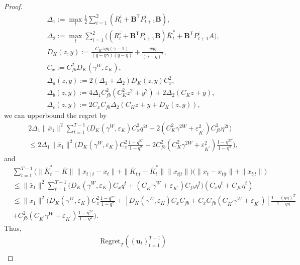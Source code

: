 \documentclass[letterpaper, 10 pt, conference]{ieeeconf}  %
\newcommand{\transpose}{\mathsf{T}}
\begin{document}
\begin{proof}
\begin{align*}
    &\Delta_{1} := \max_{t} \frac{1}{2}\sum_{i=1}^{2}(R_{t}^{i}+\mathbf{B}^{\transpose}P_{t+1}^{i}\mathbf{B}),\\
    &\Delta_{2} := \max_{t} \sum_{i=1}^{2}\bigg( (R_{t}^{i}+\mathbf{B}^{\transpose}P_{t+1}^{i}\mathbf{B})\bar{K}_{t}^{*}+\mathbf{B}^{\transpose}P_{t+1}^{i}A\bigg),\\
    &D_{K}(z,y) := \frac{C_{K}zq\eta(\gamma-1)}{(q-\eta\gamma)(q-\eta)} + \frac{yq\eta}{(q-\eta)^{2}},\\
    &C_{x} := C_{fb}^{2}D_{K}(\gamma^{W},\varepsilon_{K}),\\
    &\Delta_{a}(z,y) := 2(\Delta_{1}+\Delta_{2})D_{K}(z,y)C_{x}^{2},\\
    &\Delta_{b}(z,y) := 4\Delta_{1}C_{fb}^{2}(C_{K}^{2}z^{2}+y^{2})+2\Delta_{2}(C_{K}z+y),\\
    &\Delta_{c}(z,y) := 2C_{x}C_{fb}\Delta_{2}(C_{K}z+y+D_{K}(z,y)),
\end{align*}
we can upperbound the regret by
\begin{align*}
    &2\Delta_{1}\|\bar{x}_{1}\|^{2}\sum_{t=1}^{T-1}\bigg(D_{K}(\gamma^{W},\varepsilon_{K})C_{x}^{2}q^{2t} + 2(C_{K}^{2}\gamma^{2W}+\varepsilon_{K^{'}}^{2})C_{fb}^{2}\eta^{2t}\bigg) \\
    &\leq 2\Delta_{1}\|\bar{x}_{1}\|^{2}\bigg(D_{K}(\gamma^{W},\varepsilon_{K})C_{x}^{2}\frac{1-q^{2T}}{1-q^{2}} + 2C_{fb}^{2}(C_{K}^{2}\gamma^{2W}+\varepsilon_{K^{'}}^{2})\frac{1-\eta^{2T}}{1-\eta^{2}} \bigg),
\end{align*}
and
\begin{align*}
    &\sum_{t=1}^{T-1}\bigg( \|\bar{K}_{t}^{*}-\bar{K}\|\|x_{t\mid t}-x_{t}\|  + \|\bar{K}_{t|t}-\bar{K}_{t}^{*}\| \|x_{t|t}\|\bigg)\bigg(\|x_{t}-x_{t|t}\| + \|x_{t|t}\|\bigg)\\
    &\leq \|\bar{x}_{1}\|^{2}\sum_{t=1}^{T-1}\bigg(D_{K}(\gamma^{W},\varepsilon_{K})C_{x}q^{t}+(C_{K^{'}}\gamma^{W}+\varepsilon_{K^{'}})C_{fb}\eta^{t}\bigg)(C_{x}q^{t}+C_{fb}\eta^{t})\\
    &\leq \|\bar{x}_{1}\|^{2}\bigg(D_{K}(\gamma^{W},\varepsilon_{K})C_{x}^{2}\frac{1-q^{2T}}{1-q^{2}}+[D_{K}(\gamma^{W},\varepsilon_{K})C_{x}C_{fb}+C_{x}C_{fb}(C_{K^{'}}\gamma^{W}+\varepsilon_{K^{'}})]\frac{1-(q\eta)^{T}}{1-q\eta}\\
    &+ C_{fb}^{2}(C_{K^{'}}\gamma^{W}+\varepsilon_{K^{'}})\frac{1-\eta^{2T}}{1-\eta^{2}} \bigg).
\end{align*}
Thus,
\begin{align*}
    &\text{Regret}_{T}((\mathbf{u}_{t})_{t=1}^{T-1})\\

\end{align*}
\end{proof}
\end{document}

